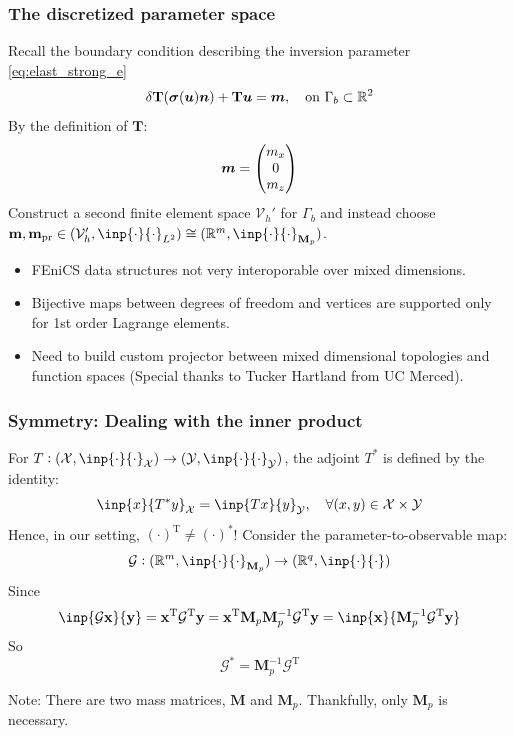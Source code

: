 \documentclass[
  pdf,
  10pt,
  xcolor={svgnames},
]{beamer}
\newcommand{\mc}[1]{\mathcal{#1}}
\newcommand{\R}{\mathbb{R}}
\newcommand{\T}{\mathrm{T}}
\renewcommand{\vec}[1]{{\mathchoice
                     {\mbox{\boldmath$\displaystyle{#1}$}}
                     {\mbox{\boldmath$\textstyle{#1}$}}
                     {\mbox{\boldmath$\scriptstyle{#1}$}}
                     {\mbox{\boldmath$\scriptscriptstyle{#1}$}}}}
\newcommand{\mat}[1]{\mathbf{{#1}}}
\begin{document}
\begin{frame}
  \frametitle{The discretized parameter space}
  Recall the boundary condition describing the inversion parameter
  \eqref{eq:elast_strong_e}
  \[
    \delta \mat{T}(\vec{\sigma}(\vec{u}) \vec{n}) + \mat{T}\vec{u}
    = \vec{m}
    , \quad \text{on } \Gamma_b \subset \R^2
  \]
  By the definition of $\mat{T}$:
  \[
    \vec{m} = \begin{pmatrix} m_x \\ 0 \\ m_z \end{pmatrix}
  \]
  Construct a second finite element space $\mc{V}_h'$ for $\Gamma_b$ and instead
  choose $\vb{m}, \vb{m}_{\rm pr} \in (\mc{V}_h', \inp{\cdot}{\cdot}_{L^2}) \cong
  (\R^m, \inp{\cdot}{\cdot}_{\mat{M}_p})$.
  \begin{itemize}
    \item FEniCS data structures not very interoporable over mixed dimensions.
    \item Bijective maps between degrees of freedom and vertices are supported
      only for 1st order Lagrange elements.
    \item Need to build custom projector between mixed dimensional topologies
      and function spaces (Special thanks to Tucker Hartland from UC Merced).
  \end{itemize}
\end{frame}

\begin{frame}
  \frametitle{Symmetry: Dealing with the inner product}
  For $T: (\mc{X}, \inp{\cdot}{\cdot}_\mc{X}) \to (\mc{Y},
  \inp{\cdot}{\cdot}_\mc{Y})$, the adjoint $T^*$ is defined by the identity:
  \[
    \inp{x}{T^*y}_\mc{X} = \inp{Tx}{y}_\mc{Y}
    , \quad \forall (x,y) \in \mc{X} \times \mc{Y}
  \]
  Hence, in our setting, $(\cdot)^\T \neq (\cdot)^*$!
  \pause
  Consider the parameter-to-observable map:
  \[
    \mc{G}:
    (\R^m, \inp{\cdot}{\cdot}_{\mat{M}_p}) \to (\R^q, \inp{\cdot}{\cdot})
  \]
  Since
  \[
    \inp{\mc{G}\vb{x}}{\vb{y}}
    = \vb{x}^\T \mc{G}^\T \vb{y}
    = \vb{x}^\T \mat{M}_p \mat{M}_p^{-1} \mc{G}^\T  \vb{y}
    = \inp{\vb{x}}{\mat{M}_p^{-1} \mc{G}^\T \vb{y}}
  \]
  So
  \[
    \mc{G}^* = \mat{M}_p^{-1}\mc{G}^\T
  \]
  \pause
  \vspace{-1em}
  \begin{alertblock}{Note:}
    There are two mass matrices, $\mat{M}$ and $\mat{M}_p$. Thankfully, only
    $\mat{M}_p$ is necessary.
  \end{alertblock}
\end{frame}
\end{document}
